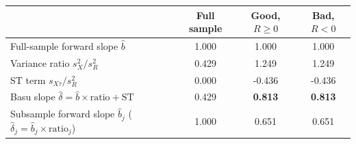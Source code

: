 \begin{tabular}{@{}lccc@{}}
\toprule
 & Full sample & Good, $R \ge 0$ & Bad, $R < 0$ \\
\midrule
Full-sample forward slope $\hat b$ & 1.000 & 1.000 & 1.000 \\
Variance ratio $s^2_X/s^2_R$ & 0.429 & 1.249 & 1.249 \\
ST term $s_{X\tau}/s^2_R$ & 0.000 & -0.436 & -0.436 \\
Basu slope $\hat\delta = \hat b \times \text{ratio} + \text{ST}$ & 0.429 & \textcolor{DeepNavy}{\bfseries 0.813} & \textcolor{DeepNavy}{\bfseries 0.813} \\
\midrule
Subsample forward slope $\hat b_j$ ($\hat\delta_j = \hat b_j \times \text{ratio}_j$) & 1.000 & 0.651 & 0.651 \\
\bottomrule
\end{tabular}
